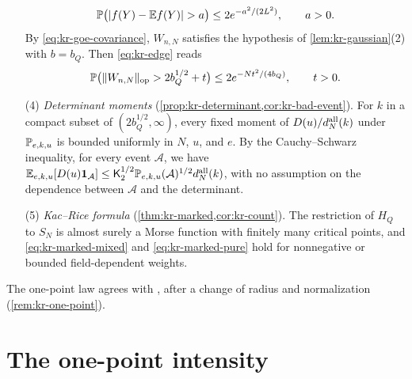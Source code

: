 \begin{enumerate}
\begin{equation}\label{eq:mo-gauss}
\Pp\bigl(|f(Y)-\E f(Y)|>a\bigr)\le2e^{-a^2/(2L^2)},\qquad a>0.
\end{equation}
By \eqref{eq:kr-goe-covariance}, $W_{n,N}$ satisfies the hypothesis of \cref{lem:kr-gaussian}(2) with $b=b_Q$. Then \eqref{eq:kr-edge} reads
\begin{equation}\label{eq:mo-edge}
\Pp\bigl(\|W_{n,N}\|_{\rm op}>2b_Q^{1/2}+t\bigr)\le2e^{-Nt^2/(4b_Q)},\qquad t>0.
\end{equation}
\item[(4)] \emph{Determinant moments} (\cref{prop:kr-determinant,cor:kr-bad-event}). For $k$ in a compact subset of $(2b_Q^{1/2},\infty)$, every fixed moment of $D(u)/d_N^{\rm all}(k)$ under $\mathbb P_{e,k,u}$ is bounded uniformly in $N$, $u$, and $e$. By the Cauchy--Schwarz inequality, for every event $\mathcal A$, we have $\mathbb E_{e,k,u}[D(u)\mathbf 1_{\mathcal A}]\le\mathsf K_2^{1/2}\mathbb P_{e,k,u}(\mathcal A)^{1/2}d_N^{\rm all}(k)$, with no assumption on the dependence between $\mathcal A$ and the determinant.
\item[(5)] \emph{Kac--Rice formula} (\cref{thm:kr-marked,cor:kr-count}). The restriction of $H_Q$ to $S_N$ is almost surely a Morse function with finitely many critical points, and \eqref{eq:kr-marked-mixed} and \eqref{eq:kr-marked-pure} hold for nonnegative or bounded field-dependent weights.
\end{enumerate}
The one-point law agrees with \cite[Section~4.1, Eq.~(4.1)]{BenArousSubagZeitouni2020}, after a change of radius and normalization (\cref{rem:kr-one-point}).


\section{The one-point intensity}\label{sec:mo-intensity}

